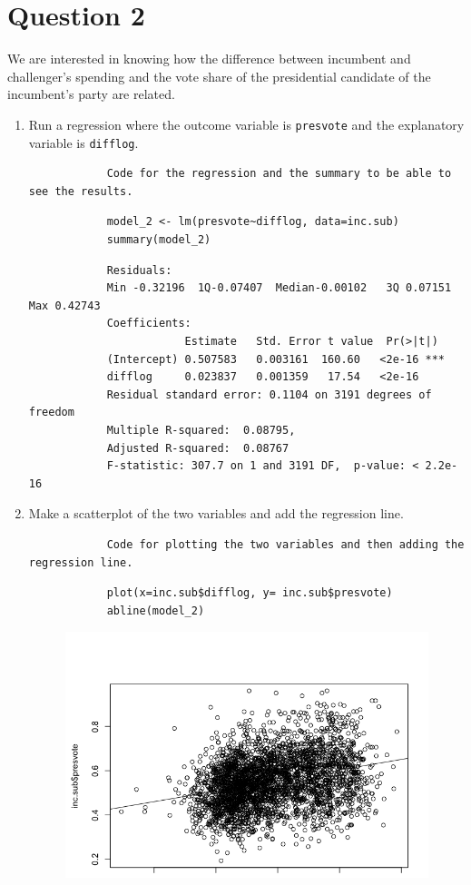 \documentclass[12pt,letterpaper]{article}
\begin{document}
\section*{Question 2}
\noindent We are interested in knowing how the difference between incumbent and challenger's spending and the vote share of the presidential candidate of the incumbent's party are related.	\vspace{.25cm}
	\begin{enumerate}
		\item Run a regression where the outcome variable is \texttt{presvote} and the explanatory variable is \texttt{difflog}.
		\begin{verbatim}
			Code for the regression and the summary to be able to see the results.
		\end{verbatim}
		\begin{lstlisting}
			model_2 <- lm(presvote~difflog, data=inc.sub)
			summary(model_2)
		\end{lstlisting}
		\begin{verbatim}
			Residuals:     
			Min -0.32196  1Q-0.07407  Median-0.00102   3Q 0.07151   Max 0.42743 
			Coefficients:          
			            Estimate   Std. Error t value  Pr(>|t|)    
			(Intercept) 0.507583   0.003161  160.60   <2e-16 ***
			difflog     0.023837   0.001359   17.54   <2e-16  
			Residual standard error: 0.1104 on 3191 degrees of freedom
			Multiple R-squared:  0.08795,	
			Adjusted R-squared:  0.08767 
			F-statistic: 307.7 on 1 and 3191 DF,  p-value: < 2.2e-16
		\end{verbatim}
		\item Make a scatterplot of the two variables and add the regression line. 
		\begin{verbatim}
			Code for plotting the two variables and then adding the regression line.
		\end{verbatim}
		\begin{lstlisting}
			plot(x=inc.sub$difflog, y= inc.sub$presvote)
			abline(model_2)
		\end{lstlisting}
		\begin{figure}
			\vspace{-1cm}
			\includegraphics[width=15cm]{Rplot2im.png}

\end{figure}
\end{enumerate}
\end{document}

